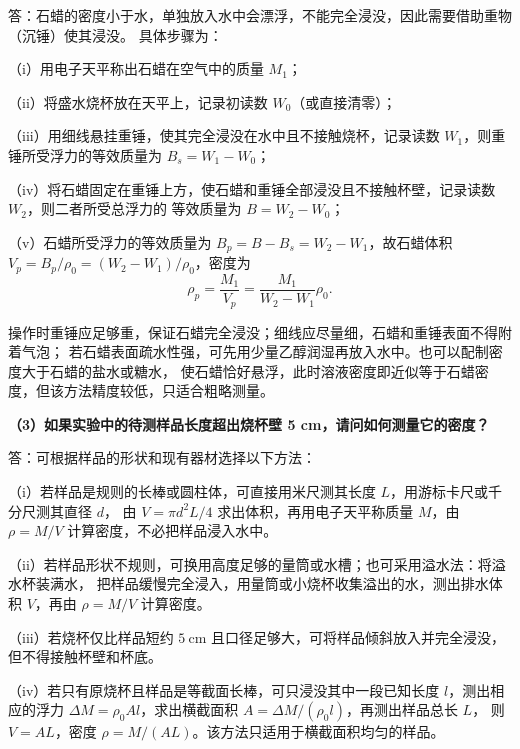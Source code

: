 \documentclass[12pt,a4paper,fontset=windows]{ctexart}
\begin{document}
\vspace{0.05cm}
答：石蜡的密度小于水，单独放入水中会漂浮，不能完全浸没，因此需要借助重物（沉锤）使其浸没。
具体步骤为：

（i）用电子天平称出石蜡在空气中的质量 $M_1$；

（ii）将盛水烧杯放在天平上，记录初读数 $W_0$（或直接清零）；

（iii）用细线悬挂重锤，使其完全浸没在水中且不接触烧杯，记录读数 $W_1$，则重锤所受浮力的等效质量为
$B_s=W_1-W_0$；

（iv）将石蜡固定在重锤上方，使石蜡和重锤全部浸没且不接触杯壁，记录读数 $W_2$，则二者所受总浮力的
等效质量为 $B=W_2-W_0$；

（v）石蜡所受浮力的等效质量为 $B_p=B-B_s=W_2-W_1$，故石蜡体积
$V_p=B_p/\rho_0=(W_2-W_1)/\rho_0$，密度为
\begin{equation*}
    \rho_p=\frac{M_1}{V_p}
    =\frac{M_1}{W_2-W_1}\rho_0.
\end{equation*}

操作时重锤应足够重，保证石蜡完全浸没；细线应尽量细，石蜡和重锤表面不得附着气泡；
若石蜡表面疏水性强，可先用少量乙醇润湿再放入水中。也可以配制密度大于石蜡的盐水或糖水，
使石蜡恰好悬浮，此时溶液密度即近似等于石蜡密度，但该方法精度较低，只适合粗略测量。

\vspace{0.15cm}
\noindent\textbf{（3）如果实验中的待测样品长度超出烧杯壁 5 cm，请问如何测量它的密度？}

\vspace{0.05cm}
答：可根据样品的形状和现有器材选择以下方法：

（i）若样品是规则的长棒或圆柱体，可直接用米尺测其长度 $L$，用游标卡尺或千分尺测其直径 $d$，
由 $V=\pi d^2L/4$ 求出体积，再用电子天平称质量 $M$，由 $\rho=M/V$ 计算密度，不必把样品浸入水中。

（ii）若样品形状不规则，可换用高度足够的量筒或水槽；也可采用溢水法：将溢水杯装满水，
把样品缓慢完全浸入，用量筒或小烧杯收集溢出的水，测出排水体积 $V$，再由 $\rho=M/V$ 计算密度。

（iii）若烧杯仅比样品短约 $5\ \mathrm{cm}$ 且口径足够大，可将样品倾斜放入并完全浸没，
但不得接触杯壁和杯底。

（iv）若只有原烧杯且样品是等截面长棒，可只浸没其中一段已知长度 $l$，测出相应的浮力
$\Delta M=\rho_0Al$，求出横截面积 $A=\Delta M/(\rho_0l)$，再测出样品总长 $L$，
则 $V=AL$，密度 $\rho=M/(AL)$。该方法只适用于横截面积均匀的样品。



\vspace{0.3cm}
\end{document}
